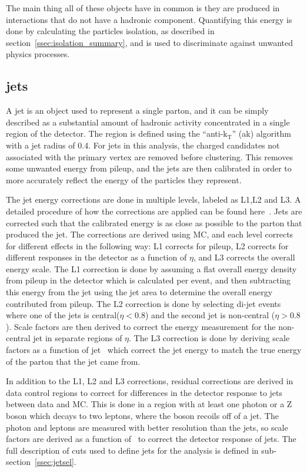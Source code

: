 The main thing all of these objects have in common is they are produced in interactions that do not have a hadronic component.
Quantifying this energy is done by calculating the particles isolation, as described in section~\ref{ssec:isolation_summary},
and is used to discriminate against unwanted physics processes.



\subsection{jets}
\label{ssec:jets}
A jet is an object used to represent a single parton, and it can be simply described as a substantial amount of hadronic activity concentrated in a single region of the detector.
The region is defined using the ``anti-$\mathrm{k_{T}}$'' (ak) algorithm~\cite{antikt} with a jet radius of 0.4.
For jets in this analysis, the charged candidates not associated with the primary vertex are removed before clustering. 
This removes some unwanted energy from pileup, and the jets are then calibrated in order to more accurately reflect the energy of the particles they represent.

The jet energy corrections are done in multiple levels, labeled as L1,L2 and L3.
A detailed procedure of how the corrections are applied can be found here~\cite{CMS-DP-2015-044}.
Jets are corrected such that the calibrated energy is as close as possible to the parton that produced the jet.
The corrections are derived using MC, and each level corrects for different effects in the following way:
L1 corrects for pileup,
L2 corrects for different responses in the detector as a function of $\eta$,
and L3 corrects the overall energy scale.
The L1 correction is done by assuming a flat overall energy density from pileup in the detector which is calculated per event,
and then subtracting this energy from the jet using the jet area to determine the overall energy contributed from pileup.
The L2 correction is done by selecting di-jet events where one of the jets is central($\eta < 0.8$) and the second jet is non-central ($\eta > 0.8$).
Scale factors are then derived to correct the energy measurement for the non-central jet in separate regions of $\eta$.
The L3 correction is done by deriving scale factors as a function of jet \pt\ which correct the jet energy to match the true energy of the parton that the jet came from.

In addition to the L1, L2 and L3 corrections, residual corrections are derived in data control regions to correct for differences in the detector response to jets between data and MC.
This is done in a region with at least one photon or a Z boson which decays to two leptons, where the boson recoils off of a jet.
The photon and leptons are measured with better resolution than the jets, so scale factors are derived as a function of \pt\ to correct the detector response of jets.
The full description of cuts used to define jets for the analysis is defined in sub-section~\ref{ssec:jetsel}.
